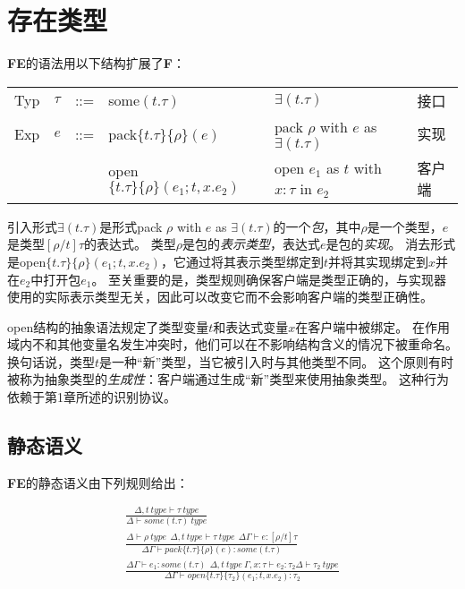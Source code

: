 ﻿\section{存在类型}
\textbf{FE}的语法用以下结构扩展了\textbf{F}：

\begin{tabular}{llllll}
Typ & $\tau$ & ::= & some$(t.\tau)$ & $\exists(t.\tau)$ & 接口\\
Exp & $e$ & ::= & pack$\{t.\tau\}\{\rho\}(e)$ & pack $\rho$ with $e$ as $\exists(t.\tau)$ & 实现\\
 &  &  & open$\{t.\tau\}\{\rho\}(e_{1};t,x.e_{2})$ & open $e_{1}$ as $t$ with $x:\tau$ in $e_{2}$ & 客户端\\
\end{tabular}

引入形式$\exists(t.\tau)$是形式pack $\rho$ with $e$ as $\exists(t.\tau)$的一个\textit{包}，其中$\rho$是一个类型，$e$是类型$[\rho/t]\tau$的表达式。
类型$\rho$是包的\textit{表示类型}，表达式$e$是包的\textit{实现}。
消去形式是open$\{t.\tau\}\{\rho\}(e_{1};t,x.e_{2})$，它通过将其表示类型绑定到$t$并将其实现绑定到$x$并在$e_{2}$中打开包$e_{1}$。
至关重要的是，类型规则确保客户端是类型正确的，与实现器使用的实际表示类型无关，因此可以改变它而不会影响客户端的类型正确性。

open结构的抽象语法规定了类型变量$t$和表达式变量$x$在客户端中被绑定。
在作用域内不和其他变量名发生冲突时，他们可以在不影响结构含义的情况下被重命名。
换句话说，类型$t$是一种“新”类型，当它被引入时与其他类型不同。
这个原则有时被称为抽象类型的\textit{生成性}：客户端通过生成“新”类型来使用抽象类型。
这种行为依赖于第1章所述的识别协议。

\subsection{静态语义}

\textbf{FE}的静态语义由下列规则给出：

\begin{subequations}
	\begin{gather}
		\frac{\Delta,t\ type \vdash \tau\ type}{\Delta \vdash some(t.\tau)\ type}\\
		\frac{\Delta \vdash \rho\ type\ \ \Delta,t\ type \vdash \tau\ type\ \ \Delta \Gamma \vdash e:[\rho/t]\tau}
			{\Delta \Gamma \vdash pack\{t.\tau\}\{\rho\}(e):some(t.\tau)}\\
		\frac{\Delta \Gamma \vdash e_{1}:some(t.\tau)\ \ \Delta,t\ type\ \Gamma,x:\tau \vdash e_{2}:\tau_{2}  \Delta \vdash \tau_{2}\ type}
			{\Delta \Gamma \vdash open\{t.\tau\}\{\tau_{2}\}(e_{1};t,x.e_{2}):\tau_{2}}
	\end{gather}
\end{subequations}

